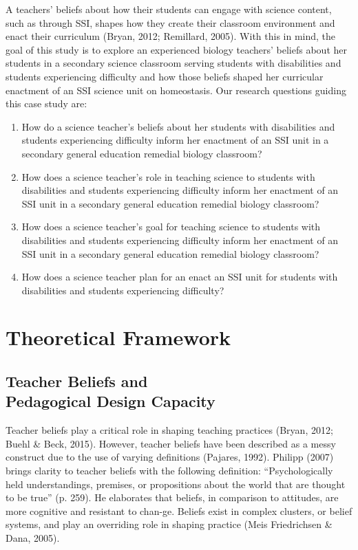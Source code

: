 \documentclass[11.5pt]{sig-alternate}
\begin{document}
\begin{large}
A teachers’ beliefs about how their students can engage with science content, such as through SSI, shapes how they create their classroom environment and enact their curriculum (Bryan, 2012; Remillard, 2005). With this in mind, the goal of this study is to explore an experienced biology teachers’ beliefs about her students in a secondary science classroom serving students with disabilities and students experiencing difficulty and how those beliefs shaped her curricular enactment of an SSI science unit on homeostasis. Our research questions guiding this case study are:

\begin{enumerate}
    \item How do a science teacher’s beliefs about her students with disabilities and students experiencing difficulty inform her enactment of an SSI unit in a secondary general education remedial biology classroom?
    \item How does a science teacher’s role in teaching science to students with disabilities and students experiencing difficulty inform her enactment of an SSI unit in a secondary general education remedial biology classroom?
    \item How does a science teacher’s goal for teaching science to students with disabilities and students experiencing difficulty inform her enactment of an SSI unit in a secondary general education remedial biology classroom?
    \item How does a science teacher plan for an enact an SSI unit for students with disabilities and students experiencing difficulty?
\end{enumerate}

\section*{Theoretical Framework}
\subsection*{Teacher Beliefs and \\Pedagogical Design Capacity}

Teacher beliefs play a critical role in shaping teaching practices (Bryan, 2012; Buehl \& Beck, 2015). However, teacher beliefs have been described as a messy construct due to the use of varying definitions (Pajares, 1992). Philipp (2007) brings clarity to teacher beliefs with the following definition: “Psychologically held understandings, premises, or propositions about the world that are thought to be true” (p. 259). He elaborates that beliefs, in comparison to attitudes, are more cognitive and resistant to chan-ge. Beliefs exist in complex clusters, or belief systems, and play an overriding role in shaping practice (Meis Friedrichsen \& Dana, 2005).


\end{large}
\end{document}
